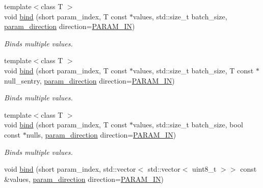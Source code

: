 \begin{DoxyCompactItemize}
{\footnotesize template$<$class T $>$ }\\void \mbox{\hyperlink{group__bind__multi_ga21de5d66a3e381040ca03a4f0fdcc5db}{bind}} (short param\+\_\+index, T const $\ast$values, std\+::size\+\_\+t batch\+\_\+size, \mbox{\hyperlink{classnanodbc_1_1statement_a523142f53cbbee8d68a074da993e7fa6}{param\+\_\+direction}} direction=\mbox{\hyperlink{classnanodbc_1_1statement_a523142f53cbbee8d68a074da993e7fa6ae33f42ce0677d00c291ff4d8e39f99de}{P\+A\+R\+A\+M\+\_\+\+IN}})
\begin{DoxyCompactList}\small\item\em Binds multiple values. \end{DoxyCompactList}\item 
{\footnotesize template$<$class T $>$ }\\void \mbox{\hyperlink{group__bind__multi_gadc594c1e061661b7f95639fcf25ec2cb}{bind}} (short param\+\_\+index, T const $\ast$values, std\+::size\+\_\+t batch\+\_\+size, T const $\ast$null\+\_\+sentry, \mbox{\hyperlink{classnanodbc_1_1statement_a523142f53cbbee8d68a074da993e7fa6}{param\+\_\+direction}} direction=\mbox{\hyperlink{classnanodbc_1_1statement_a523142f53cbbee8d68a074da993e7fa6ae33f42ce0677d00c291ff4d8e39f99de}{P\+A\+R\+A\+M\+\_\+\+IN}})
\begin{DoxyCompactList}\small\item\em Binds multiple values. \end{DoxyCompactList}\item 
{\footnotesize template$<$class T $>$ }\\void \mbox{\hyperlink{group__bind__multi_gab7047fdb7cfec9bed6861b9a9c9b98cb}{bind}} (short param\+\_\+index, T const $\ast$values, std\+::size\+\_\+t batch\+\_\+size, bool const $\ast$nulls, \mbox{\hyperlink{classnanodbc_1_1statement_a523142f53cbbee8d68a074da993e7fa6}{param\+\_\+direction}} direction=\mbox{\hyperlink{classnanodbc_1_1statement_a523142f53cbbee8d68a074da993e7fa6ae33f42ce0677d00c291ff4d8e39f99de}{P\+A\+R\+A\+M\+\_\+\+IN}})
\begin{DoxyCompactList}\small\item\em Binds multiple values. \end{DoxyCompactList}\item 
void \mbox{\hyperlink{group__bind__multi_gac04830aadf2e00d3a3d05af8690eb241}{bind}} (short param\+\_\+index, std\+::vector$<$ std\+::vector$<$ uint8\+\_\+t $>$$>$ const \&values, \mbox{\hyperlink{classnanodbc_1_1statement_a523142f53cbbee8d68a074da993e7fa6}{param\+\_\+direction}} direction=\mbox{\hyperlink{classnanodbc_1_1statement_a523142f53cbbee8d68a074da993e7fa6ae33f42ce0677d00c291ff4d8e39f99de}{P\+A\+R\+A\+M\+\_\+\+IN}})
$$
\end{DoxyCompactItemize}
